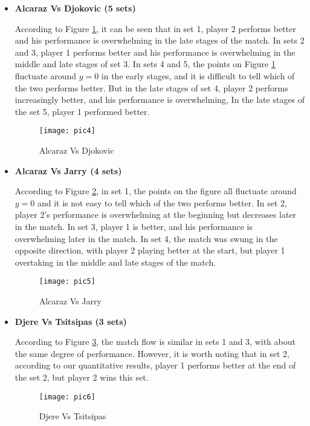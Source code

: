 \documentclass[12pt]{article}  %
\begin{document}
\begin{itemize}
	\setlength{\parsep}{0ex} 
	\setlength{\topsep}{2ex} 
	\setlength{\itemsep}{1ex} 
	\item \textbf{Alcaraz Vs Djokovic (5 sets)}
	
	\hspace*{2em}According to Figure \ref{pic4}, it can be seen that in set 1, player 2 performs better and his performance is overwhelming in the late stages of the match. In sets 2 and 3, player 1 performs better and his performance is overwhelming in the middle and late stages of set 3. In sets 4 and 5, the points on Figure \ref{pic4} fluctuate around $y=0$ in the early stages, and it is difficult to tell which of the two performs better. But in the late stages of set 4, player 2 performs increasingly better, and his performance is overwhelming, In the late stages of the set 5, player 1 performed better.
	
	\begin{figure}[htbp]  %
		\centering  %
		\texttt{[image: pic4]} %
		\caption{Alcaraz Vs Djokovic}  
		\label{pic4}
	\end{figure}
	
	\item \textbf{Alcaraz Vs Jarry (4 sets)}
	
	\hspace*{2em}According to Figure \ref{pic5}, in set 1, the points on the figure all fluctuate around $y=0$ and it is not easy to tell which of the two performs better. In set 2, player 2's performance is overwhelming at the beginning but decreases later in the match. In set 3, player 1 is better, and his performance is overwhelming later in the match. In set 4, the match was swung in the opposite direction, with player 2 playing better at the start, but player 1 overtaking in the middle and late stages of the match.
	
	\begin{figure}[htbp]  %
		\centering  %
		\texttt{[image: pic5]} %
		\caption{Alcaraz Vs Jarry}  
		\label{pic5}
	\end{figure}
	
	\item \textbf{Djere Vs Tsitsipas (3 sets)}
	
	\hspace*{2em}According to Figure \ref{pic6}, the match flow is similar in sets 1 and 3, with about the same degree of performance. However, it is worth noting that in set 2, according to our quantitative results, player 1 performs better at the end of the set 2, but player 2 wins this set.
	
	\begin{figure}[H]  %
		\centering  %
		\texttt{[image: pic6]} %
		\caption{Djere Vs Tsitsipas}  
		\label{pic6}
	\end{figure}
\end{itemize}
\end{document}
